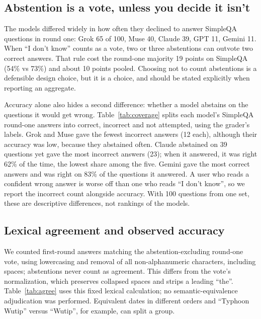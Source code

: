 \documentclass[11pt]{article}
\begin{document}
\subsection{Abstention is a vote, unless you decide it isn't}
\label{sec:abstain}
The models differed widely in how often they declined to answer SimpleQA questions in round one: Grok 65 of 100, Muse 40, Claude 39, GPT 11, Gemini 11. When ``I don't know'' counts as a vote, two or three abstentions can outvote two correct answers. That rule cost the round-one majority 19 points on SimpleQA (54\% vs 73\%) and about 10 points pooled. Choosing not to count abstentions is a defensible design choice, but it is a choice, and should be stated explicitly when reporting an aggregate.

Accuracy alone also hides a second difference: whether a model abstains on the questions it would get wrong. Table~\ref{tab:coverage} splits each model's SimpleQA round-one answers into correct, incorrect and not attempted, using the grader's labels. Grok and Muse gave the fewest incorrect answers (12 each), although their accuracy was low, because they abstained often. Claude abstained on 39 questions yet gave the most incorrect answers (23); when it answered, it was right 62\% of the time, the lowest share among the five. Gemini gave the most correct answers and was right on 83\% of the questions it answered. A user who reads a confident wrong answer is worse off than one who reads ``I don't know'', so we report the incorrect count alongside accuracy. With 100 questions from one set, these are descriptive differences, not rankings of the models.

\subsection{Lexical agreement and observed accuracy}
\label{sec:agreement}
We counted first-round answers matching the abstention-excluding round-one vote, using lowercasing and removal of all non-alphanumeric characters, including spaces; abstentions never count as agreement. This differs from the vote's normalization, which preserves collapsed spaces and strips a leading ``the''. Table~\ref{tab:agree} uses this fixed lexical calculation; no semantic-equivalence adjudication was performed. Equivalent dates in different orders and ``Typhoon Wutip'' versus ``Wutip'', for example, can split a group.
\end{document}
